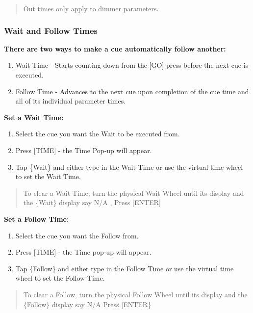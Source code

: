 \documentclass[
]{article}
\begin{document}
\begin{quote}
{Out times only apply to dimmer parameters.}
\end{quote}

\hypertarget{wait-and-follow-times}{%
\subsubsection{Wait and Follow Times}\label{wait-and-follow-times}}

\textbf{There are two ways to make a cue automatically follow another:}

\begin{enumerate}
\def\labelenumi{\arabic{enumi}.}
\item
  Wait Time - Starts counting down from the {[}GO{]} press before the next cue is executed.
\item
  Follow Time - Advances to the next cue upon completion of the cue time and all of its individual parameter times.
\end{enumerate}

\textbf{Set a Wait Time:}

\begin{enumerate}
\def\labelenumi{\arabic{enumi}.}
\item
  Select the cue you want the Wait to be executed from.
\item
  Press {[}TIME{]} - the Time Pop-up will appear.
\item
  Tap \{Wait\} and either type in the Wait Time or use the virtual time wheel to set the Wait Time.
\end{enumerate}

\begin{quote}
To clear a Wait Time, turn the physical Wait Wheel until its display and the \{Wait\} display say N/A , Press {[}ENTER{]}
\end{quote}

\textbf{Set a Follow Time:}

\begin{enumerate}
\def\labelenumi{\arabic{enumi}.}
\item
  Select the cue you want the Follow from.
\item
  Press {[}TIME{]} - the Time pop-up will appear.
\item
  Tap \{Follow\} and either type in the Follow Time or use the virtual time wheel to set the Follow Time.
\end{enumerate}

\begin{quote}
To clear a Follow, turn the physical Follow Wheel until its display and the \{Follow\} display say N/A Press {[}ENTER\}
\end{quote}
\end{document}
